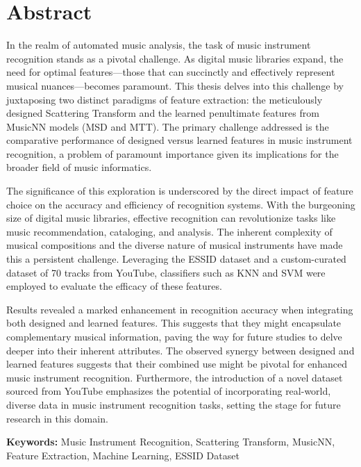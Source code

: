 \chapter*{Abstract}

In the realm of automated music analysis, the task of music instrument recognition stands as a pivotal challenge. As digital music libraries expand, the need for optimal features---those that can succinctly and effectively represent musical nuances---becomes paramount. This thesis delves into this challenge by juxtaposing two distinct paradigms of feature extraction: the meticulously designed Scattering Transform and the learned penultimate features from MusicNN models (MSD and MTT). The primary challenge addressed is the comparative performance of designed versus learned features in music instrument recognition, a problem of paramount importance given its implications for the broader field of music informatics.

The significance of this exploration is underscored by the direct impact of feature choice on the accuracy and efficiency of recognition systems. With the burgeoning size of digital music libraries, effective recognition can revolutionize tasks like music recommendation, cataloging, and analysis. The inherent complexity of musical compositions and the diverse nature of musical instruments have made this a persistent challenge. Leveraging the ESSID dataset and a custom-curated dataset of 70 tracks from YouTube, classifiers such as KNN and SVM were employed to evaluate the efficacy of these features.

Results revealed a marked enhancement in recognition accuracy when integrating both designed and learned features. This suggests that they might encapsulate complementary musical information, paving the way for future studies to delve deeper into their inherent attributes. The observed synergy between designed and learned features suggests that their combined use might be pivotal for enhanced music instrument recognition. Furthermore, the introduction of a novel dataset sourced from YouTube emphasizes the potential of incorporating real-world, diverse data in music instrument recognition tasks, setting the stage for future research in this domain.

\textbf{Keywords:} Music Instrument Recognition, Scattering Transform, MusicNN, Feature Extraction, Machine Learning, ESSID Dataset
\clearpage
